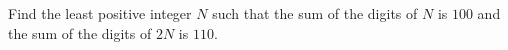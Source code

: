 Find the least positive integer $N$ such that the sum of the digits of $N$ is $100$ and the sum of the digits of $2N$ is $110$.
